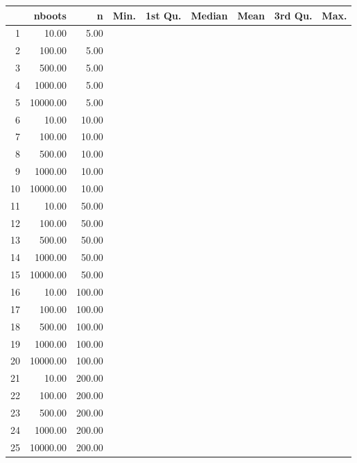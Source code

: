 \begin{table}[ht]
\centering
\begin{tabular}{rrrllllll}
  \hline
 & nboots & n & Min. & 1st Qu. & Median & Mean & 3rd Qu. & Max. \\ 
  \hline
1 & 10.00 & 5.00 &  &  &  &  &  &  \\ 
  2 & 100.00 & 5.00 &  &  &  &  &  &  \\ 
  3 & 500.00 & 5.00 &  &  &  &  &  &  \\ 
  4 & 1000.00 & 5.00 &  &  &  &  &  &  \\ 
  5 & 10000.00 & 5.00 &  &  &  &  &  &  \\ 
  6 & 10.00 & 10.00 &  &  &  &  &  &  \\ 
  7 & 100.00 & 10.00 &  &  &  &  &  &  \\ 
  8 & 500.00 & 10.00 &  &  &  &  &  &  \\ 
  9 & 1000.00 & 10.00 &  &  &  &  &  &  \\ 
  10 & 10000.00 & 10.00 &  &  &  &  &  &  \\ 
  11 & 10.00 & 50.00 &  &  &  &  &  &  \\ 
  12 & 100.00 & 50.00 &  &  &  &  &  &  \\ 
  13 & 500.00 & 50.00 &  &  &  &  &  &  \\ 
  14 & 1000.00 & 50.00 &  &  &  &  &  &  \\ 
  15 & 10000.00 & 50.00 &  &  &  &  &  &  \\ 
  16 & 10.00 & 100.00 &  &  &  &  &  &  \\ 
  17 & 100.00 & 100.00 &  &  &  &  &  &  \\ 
  18 & 500.00 & 100.00 &  &  &  &  &  &  \\ 
  19 & 1000.00 & 100.00 &  &  &  &  &  &  \\ 
  20 & 10000.00 & 100.00 &  &  &  &  &  &  \\ 
  21 & 10.00 & 200.00 &  &  &  &  &  &  \\ 
  22 & 100.00 & 200.00 &  &  &  &  &  &  \\ 
  23 & 500.00 & 200.00 &  &  &  &  &  &  \\ 
  24 & 1000.00 & 200.00 &  &  &  &  &  &  \\ 
  25 & 10000.00 & 200.00 &  &  &  &  &  &  \\ 
   \hline
\end{tabular}
\end{table}
